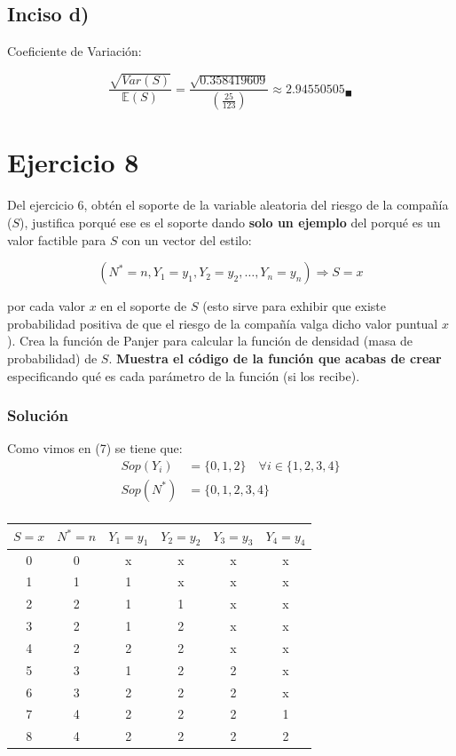 \documentclass[
]{article}
\begin{document}
\hypertarget{inciso-d-3}{%
\subsection{Inciso d)}\label{inciso-d-3}}

Coeficiente de Variación:

\[\frac{\sqrt{Var(S)}}{\mathbb{E}(S)} = \frac{\sqrt{0.358419609}}{\left(\frac{25}{123}\right)} \approx 2.94550505_\blacksquare\]

\hypertarget{ejercicio-8}{%
\section{Ejercicio 8}\label{ejercicio-8}}

Del ejercicio 6, obtén el soporte de la variable aleatoria del riesgo de
la compañía (\(S\)), justifica porqué ese es el soporte dando
\textbf{solo un ejemplo} del porqué es un valor factible para \(S\) con
un vector del estilo:

\[(N^*=n,Y_1=y_1,Y_2=y_2,\dots,Y_n=y_n) \Rightarrow S = x\]

por cada valor \(x\) en el soporte de \(S\) (esto sirve para exhibir que
existe probabilidad positiva de que el riesgo de la compañía valga dicho
valor puntual \(x\)). Crea la función de Panjer para calcular la función
de densidad (masa de probabilidad) de \(S\). \textbf{Muestra el código
de la función que acabas de crear} especificando qué es cada parámetro
de la función (si los recibe).

\hypertarget{soluciuxf3n-7}{%
\subsubsection{Solución}\label{soluciuxf3n-7}}

Como vimos en (7) se tiene que: \begin{align*}
Sop(Y_{i}) &= \{0,1,2\} \quad \forall i \in \{1,2,3,4\}\\
Sop(N^{*}) &= \{0,1,2,3,4\}\\
\end{align*}

\begin{center}
\begin{tabular}{cccccc}
  $S = x$ & $N^* = n$ & $Y_1 = y_1$ & $Y_2 = y_2$ & $Y_3 = y_3$ & $Y_4 = y_4$ \\ \hline
0 & 0 & x & x & x & x \\
1 & 1 & 1 & x & x & x \\
2 & 2 & 1 & 1 & x & x \\
3 & 2 & 1 & 2 & x & x \\
4 & 2 & 2 & 2 & x & x \\
5 & 3 & 1 & 2 & 2 & x \\
6 & 3 & 2 & 2 & 2 & x \\
7 & 4 & 2 & 2 & 2 & 1 \\
8 & 4 & 2 & 2 & 2 & 2 \\
\end{tabular}
\end{center}
\end{document}

